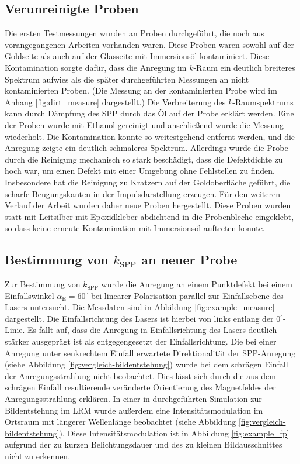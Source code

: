 \documentclass[a4paper, titlepage,  ngerman, fullpage]{book}
\begin{document}
	\subsection{Verunreinigte Proben}
	Die ersten Testmessungen wurden an Proben durchgeführt, die noch aus vorangegangenen Arbeiten vorhanden waren. Diese Proben waren sowohl auf der Goldseite als auch auf der Glasseite mit Immersionsöl kontaminiert. Diese Kontamination sorgte dafür, dass die Anregung im $k$-Raum ein deutlich breiteres Spektrum aufwies als die später durchgeführten Messungen an nicht kontaminierten Proben. (Die Messung an der kontaminierten Probe wird im Anhang \ref{fig:dirt_measure} dargestellt.) Die Verbreiterung des $k$-Raumspektrums kann durch Dämpfung des SPP durch das Öl auf der Probe erklärt werden. Eine der Proben wurde mit Ethanol gereinigt und anschließend wurde die Messung wiederholt. Die Kontamination konnte so weitestgehend entfernt werden, und die Anregung zeigte ein deutlich schmaleres Spektrum. Allerdings wurde die Probe durch die Reinigung mechanisch so stark beschädigt, dass die Defektdichte zu hoch war, um einen Defekt mit einer Umgebung ohne Fehlstellen zu finden. Insbesondere hat die Reinigung zu Kratzern auf der Goldoberfläche geführt, die scharfe Beugungskanten in der Impulsdarstellung  erzeugen. Für den weiteren Verlauf der Arbeit wurden daher neue Proben hergestellt. Diese Proben wurden statt mit Leitsilber mit Epoxidkleber abdichtend in die Probenbleche eingeklebt, so dass keine erneute Kontamination mit Immersionsöl auftreten konnte.
	\subsection{Bestimmung von  $k_{\mathrm{SPP}}$ an neuer Probe}
	Zur Bestimmung von $k_{\mathrm{SPP}}$ wurde die Anregung an einem Punktdefekt bei einem Einfallswinkel $\alpha_{\mathrm{E}} = 60^\circ$ bei linearer Polarisation parallel zur Einfallsebene des Lasers untersucht. Die Messdaten sind in Abbildung \ref{fig:example_measure} dargestellt. Die Einfallsrichtung des Lasers ist hierbei von links entlang der $0^\circ$-Linie. Es fällt auf, dass die Anregung in Einfallsrichtung des Lasers deutlich stärker ausgeprägt ist als entgegengesetzt der Einfallsrichtung. Die bei einer Anregung unter senkrechtem Einfall erwartete Direktionalität der SPP-Anregung (siehe Abbildung \ref{fig:vergleich-bildentstehung}) wurde bei dem schrägen Einfall der Anregungsstrahlung nicht beobachtet. Dies lässt sich durch die aus dem schrägen Einfall resultierende veränderte Orientierung des Magnetfeldes der Anregungsstrahlung erklären. In einer in \cite{Hohenau.2011} durchgeführten Simulation zur Bildentstehung im LRM wurde außerdem eine Intensitätsmodulation im Ortsraum mit längerer Wellenlänge beobachtet (siehe Abbildung \ref{fig:vergleich-bildentstehung}). Diese Intensitätsmodulation ist in Abbildung \ref{fig:example_fp} aufgrund der zu kurzen Belichtungsdauer und des zu kleinen Bildausschnittes nicht zu erkennen.
	
\end{document}
